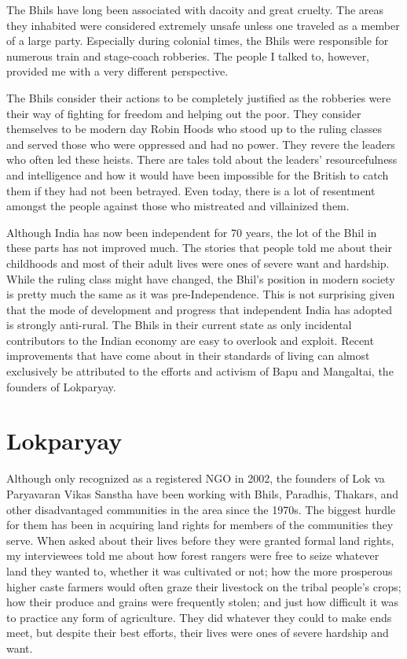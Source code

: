 \documentclass[report.tex]{subfiles}
\begin{document}
The Bhils have long been associated with dacoity and great cruelty. The areas they inhabited were considered extremely unsafe unless one traveled as a member of a large party. Especially during colonial times, the Bhils were responsible for numerous train and stage-coach robberies. The people I talked to, however, provided me with a very different perspective.

The Bhils consider their actions to be completely justified as the robberies were their way of fighting for freedom and helping out the poor. They consider themselves to be modern day Robin Hoods who stood up to the ruling classes and served those who were oppressed and had no power. They revere the leaders who often led these heists. There are tales told about the leaders' resourcefulness and intelligence and how it would have been impossible for the British to catch them if they had not been betrayed. Even today, there is a lot of resentment amongst the people against those who mistreated and villainized them.

Although India has now been independent for 70 years, the lot of the Bhil in these parts has not improved much. The stories that people told me about their childhoods and most of their adult lives were ones of severe want and hardship. While the ruling class might have changed, the Bhil's position in modern society is pretty much the same as it was pre-Independence. This is not surprising given that the mode of development and progress that independent India has adopted is strongly anti-rural. The Bhils in their current state as only incidental contributors to the Indian economy are easy to overlook and exploit. Recent improvements that have come about in their standards of living can almost exclusively be attributed to the efforts and activism of Bapu and Mangaltai, the founders of Lokparyay.

\newpage

\section{Lokparyay}\label{sec:lokparyay}

Although only recognized as a registered NGO in 2002, the founders of Lok va Paryavaran Vikas Sanstha have been working with Bhils, Paradhis, Thakars, and other disadvantaged communities in the area since the 1970s. The biggest hurdle for them has been in acquiring land rights for members of the communities they serve. When asked about their lives before they were granted formal land rights, my interviewees told me about how forest rangers were free to seize whatever land they wanted to, whether it was cultivated or not; how the more prosperous higher caste farmers would often graze their livestock on the tribal people's crops; how their produce and grains were frequently stolen; and just how difficult it was to practice any form of agriculture. They did whatever they could to make ends meet, but despite their best efforts, their lives were ones of severe hardship and want.
\end{document}
